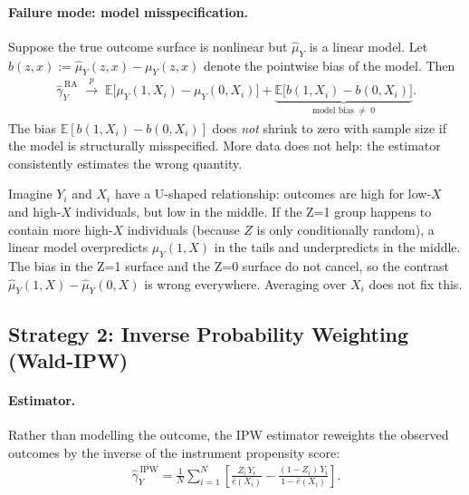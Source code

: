 \documentclass[12pt,a4paper]{article}
\theoremstyle{remark}
\newcommand{\E}{\mathbb{E}}
\newcommand{\muY}{\mu_Y}
\newcommand{\muYhat}{\hat{\mu}_Y}
\newcommand{\ehat}{\hat{e}}
\newenvironment{intuition}[1]{%
  \begin{tcolorbox}[
    enhanced,
    colback=remarkbg,
    colframe=remarkframe,
    arc=3pt,
    boxrule=0.6pt,
    left=8pt, right=8pt, top=6pt, bottom=6pt,
    title={\small\textit{Intuition: #1}},
    fonttitle=\bfseries\small,
    coltitle=black
  ]
  \small
}{%
  \end{tcolorbox}
}
\begin{document}
\paragraph{Failure mode: model misspecification.}
Suppose the true outcome surface is nonlinear but $\muYhat$ is a linear model. Let
$b(z, x) := \muYhat(z,x) - \muY(z,x)$ denote the pointwise bias of the model. Then
\begin{align}
  \hat{\gamma}_Y^{\,\mathrm{RA}}
  \;\xrightarrow{p}\;
  \E\bigl[\muY(1,X_i) - \muY(0,X_i)\bigr]
  + \underbrace{\E\bigl[b(1,X_i) - b(0,X_i)\bigr]}_{\text{model bias} \;\neq\; 0}.
  \label{eq:ra_bias}
\end{align}
The bias $\E[b(1,X_i) - b(0,X_i)]$ does \emph{not} shrink to zero with sample size
if the model is structurally misspecified. More data does not help: the estimator
consistently estimates the wrong quantity.

\begin{intuition}{Why a linear model for a curved surface goes wrong}
Imagine $Y_i$ and $X_i$ have a U-shaped relationship: outcomes are high for low-$X$
and high-$X$ individuals, but low in the middle. If the Z=1 group happens to contain
more high-$X$ individuals (because $Z$ is only conditionally random), a linear model
overpredicts $\muY(1,X)$ in the tails and underpredicts in the middle. The bias in the
Z=1 surface and the Z=0 surface do not cancel, so the contrast $\muYhat(1,X) -
\muYhat(0,X)$ is wrong everywhere. Averaging over $X_i$ does not fix this.
\end{intuition}

\subsection{Strategy 2: Inverse Probability Weighting (Wald-IPW)}
\label{subsec:ipw}

\paragraph{Estimator.}
Rather than modelling the outcome, the IPW estimator reweights the observed outcomes
by the inverse of the instrument propensity score:
\begin{align}
  \hat{\gamma}_Y^{\,\mathrm{IPW}}
  = \frac{1}{N} \sum_{i=1}^{N}
    \left[
      \frac{Z_i\, Y_i}{\ehat(X_i)}
      -
      \frac{(1-Z_i)\, Y_i}{1 - \ehat(X_i)}
    \right].
  \label{eq:ipw_estimator}
\end{align}
\end{document}
